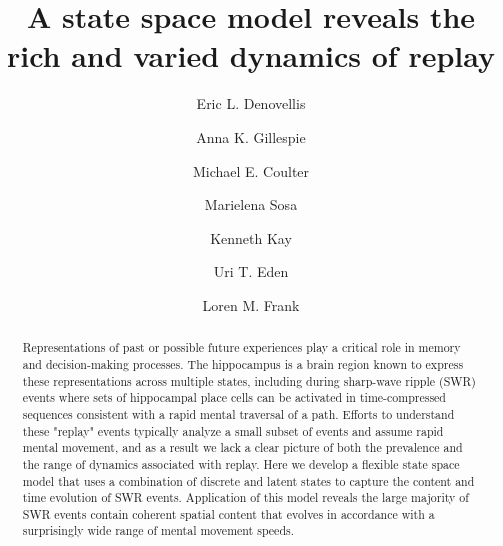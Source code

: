 \documentclass[times, twoside]{zHenriquesLab-StyleBioRxiv}
\begin{document}
\title{A state space model reveals the rich and varied dynamics of replay}

\author[1]{Eric L. Denovellis}
\author[2, 3]{Anna K. Gillespie}
\author[2, 3]{Michael E. Coulter}
\author[5]{Marielena Sosa}
\author[6]{Kenneth Kay}
\author[4]{Uri T. Eden}
\author[1, 2, 3, \Letter]{Loren M. Frank}



\maketitle

\begin{abstract}
Representations of past or possible future experiences play a critical role in memory and decision-making processes. The hippocampus is a brain region known to express these representations across multiple states, including during sharp-wave ripple (SWR) events where sets of hippocampal place cells can be activated in time-compressed sequences consistent with a rapid mental traversal of a path. Efforts to understand these "replay" events typically analyze a small subset of events and assume rapid mental movement, and as a result we lack a clear picture of both the prevalence and the range of dynamics associated with replay. Here we develop a flexible state space model that uses a combination of discrete and latent states to capture the content and time evolution of SWR events. Application of this model reveals the large majority of SWR events contain coherent spatial content that evolves in accordance with a surprisingly wide range of mental movement speeds.

\end {abstract}
\end{document}
